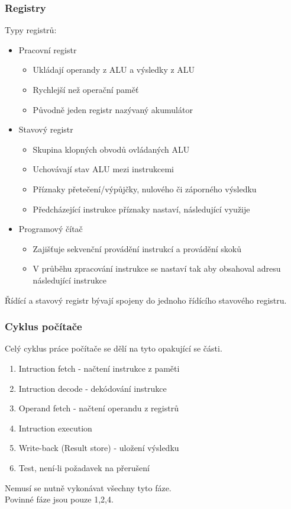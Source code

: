 \subsubsection*{Registry}
Typy registrů:
\begin{itemize}
    \item Pracovní registr
          \begin{itemize}
              \item Ukládají operandy z ALU a výsledky z ALU
              \item Rychlejší než operační paměť
              \item Původně jeden registr nazývaný akumulátor
          \end{itemize}
    \item Stavový registr
          \begin{itemize}
              \item Skupina klopných obvodů ovládaných ALU
              \item Uchovávají stav ALU mezi instrukcemi
              \item Příznaky přetečení/výpůjčky, nulového či záporného výsledku
              \item Předcházející instrukce příznaky nastaví, následující využije
          \end{itemize}
    \item Programový čítač
          \begin{itemize}
              \item Zajišťuje sekvenční provádění instrukcí a provádění skoků
              \item V průběhu zpracování instrukce se nastaví tak aby obsahoval adresu následující instrukce
          \end{itemize}
\end{itemize}
Řídící a stavový registr bývají spojeny do jednoho řídícího stavového registru.\\

\subsubsection{Cyklus počítače}
Celý cyklus práce počítače se dělí na tyto opakující se části.
\begin{enumerate}
    \item Intruction fetch - načtení instrukce z paměti
    \item Intruction decode - dekódování instrukce
    \item Operand fetch - načtení operandu z registrů
    \item Intruction execution
    \item Write-back (Result store) - uložení výsledku
    \item Test, není-li požadavek na přerušení
\end{enumerate}
Nemusí se nutně vykonávat všechny tyto fáze.\\
Povinné fáze jsou pouze 1,2,4.

